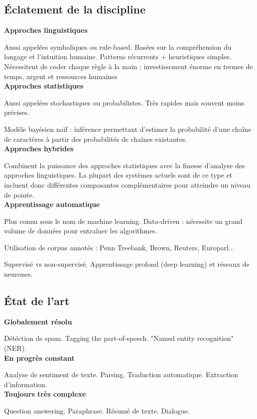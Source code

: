 \subsection{Éclatement de la discipline}

\textbf{Approches linguistiques}

Aussi appelées symboliques ou rule-based. Basées sur la compréhension du langage et
l'intuition humaine. Patterns récurrents + heuristiques simples.
Nécessitent de coder chaque règle à la main : investissement énorme en termes de temps, argent et ressources humaines \\

\textbf{Approches statistiques}

Aussi appelées stochastiques ou probabilistes. Très rapides mais souvent moins précises.

Modèle bayésien naïf : inférence permettant d'estimer la probabilité d'une chaîne de caractères à partir des probabilités de chaînes existantes. \\

\textbf{Approches hybrides}

Combinent la puissance des approches statistiques avec la finesse d'analyse des approches linguistiques.
La plupart des systèmes actuels sont de ce type et incluent donc différentes composantes complémentaires pour atteindre un niveau de pointe. \\

\textbf{Apprentissage automatique}

Plus connu sous le nom de machine learning. Data-driven : nécessite un grand volume de
données pour entraîner les algorithmes.

Utilisation de corpus annotés : Penn Treebank, Brown, Reuters, Europarl...

Supervisé vs non-supervisé. Apprentissage profond (deep learning) et réseaux de neurones.

\subsection{État de l'art}

\textbf{Globalement résolu}

Détéction de spam. Tagging the part-of-speech. "Named entity recognition" (NER).\\

\textbf{En progrès constant}

Analyse de sentiment de texte. Parsing. Traduction automatique. Extraction d'information.\\

\textbf{Toujours très complexe}

Question answering. Paraphrase. Résumé de texte. Dialogue.\\
